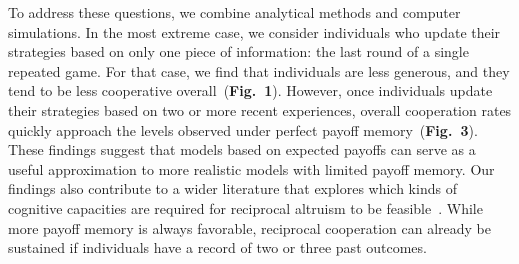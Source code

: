 \documentclass[11pt]{article}
\newcommand{\todo}[1]{\textcolor{blue}{#1}}
\newcommand{\FigBaseResults}{{\bf Fig.~1}}
\newcommand{\FigHigherMemory}{{\bf Fig.~3}}
\theoremstyle{plainCl1}
\theoremstyle{plainCl2}
\begin{document}
To address these questions, we combine analytical methods and computer simulations. 
In the most extreme case, we consider individuals who update their strategies based on only one piece of information:  the last round of a single repeated game. 
For that case, we find that individuals are less generous, and they tend to be less cooperative overall~(\FigBaseResults). 
However, once individuals update their strategies based on two or more recent experiences, overall cooperation rates quickly approach the levels observed under perfect payoff memory~(\FigHigherMemory). 
These findings suggest that models based on expected payoffs can serve as a useful approximation to more realistic models with limited payoff memory. 
Our findings also contribute to a wider literature that explores which kinds of cognitive capacities are required for reciprocal altruism to be feasible~\citep[e.g.,][]{Stevens:fip:2011,Volstorf:PlosOne:2011}. 
While more payoff memory is always favorable, reciprocal cooperation can already be sustained if individuals have a record of two or three past outcomes.\\ 

\end{document}
